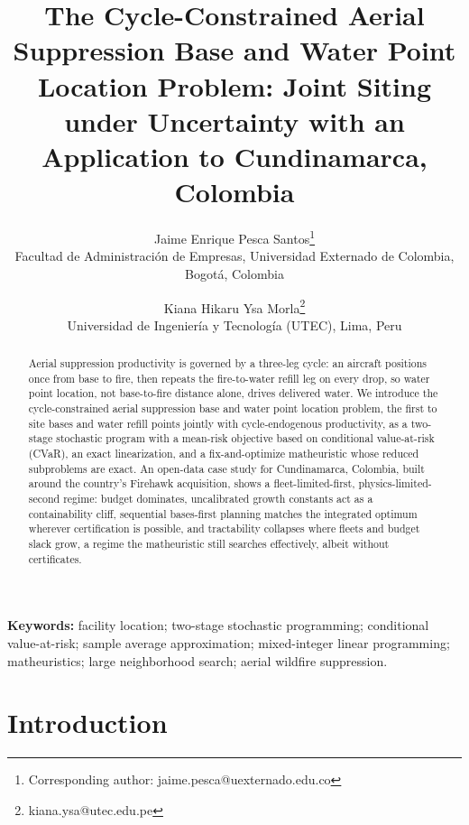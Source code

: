 \documentclass[11pt]{article}
\title{The Cycle-Constrained Aerial Suppression Base and Water Point
Location Problem: Joint Siting under Uncertainty with an Application to
Cundinamarca, Colombia}
\author{Jaime Enrique Pesca Santos\thanks{Corresponding author:
jaime.pesca@uexternado.edu.co}\\
\small Facultad de Administraci{\'o}n de Empresas, Universidad
Externado de Colombia, Bogot{\'a}, Colombia
\and
Kiana Hikaru Ysa Morla\setcounter{footnote}{3}\thanks{kiana.ysa@utec.edu.pe}\\
\small Universidad de Ingenier{\'i}a y Tecnolog{\'i}a (UTEC), Lima,
Peru}
\date{}
\begin{document}
\maketitle

\begin{abstract}
Aerial suppression productivity is governed by a three-leg cycle: an
aircraft positions once from base to fire, then repeats the
fire-to-water refill leg on every drop, so water point location, not
base-to-fire distance alone, drives delivered water. We introduce the
cycle-constrained aerial suppression base and water point location
problem, the first to site bases and water refill points jointly with
cycle-endogenous productivity, as a two-stage stochastic program with
a mean-risk objective based on conditional value-at-risk (CVaR), an
exact linearization, and a fix-and-optimize matheuristic whose reduced
subproblems are exact. An open-data case
study for Cundinamarca, Colombia, built around the country's Firehawk
acquisition, shows a fleet-limited-first, physics-limited-second
regime: budget dominates, uncalibrated growth constants act as a
containability cliff, sequential bases-first planning matches the
integrated optimum wherever certification is possible, and
tractability collapses where fleets and budget slack grow, a regime
the matheuristic still searches effectively, albeit without
certificates.
\end{abstract}

\medskip
\begin{sloppypar}
\noindent\textbf{Keywords:} facility location; two-stage stochastic
programming; conditional value-at-risk; sample average approximation;
mixed-integer linear programming; matheuristics; large neighborhood
search; aerial wildfire suppression.
\end{sloppypar}

\section{Introduction}
\label{sec:intro}
\end{document}
